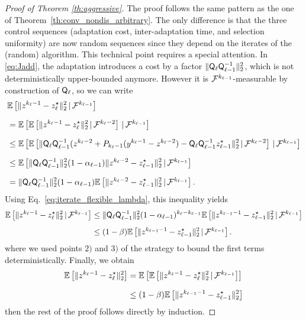 {\begin{proof}[Proof of Theorem \ref{th:aggressive}]
The proof follows the same pattern as the one of Theorem~\ref{th:conv_nondis_arbitrary}.
The only difference is that the three control sequences (adaptation cost, inter-adaptation time, and selection uniformity) are now random sequences
since they depend on the iterates of the (random) algorithm. This technical point requires a special attention. 
In \eqref{eq:Jadd}, the adaptation introduces a cost by a factor $\|  {\mathsf{Q}}_\ell   {\mathsf{Q}}_{\ell-1}^{-1} \|_2^2 $, which is not deterministically upper-bounded  anymore. However it is $\mathcal{F}^{k_{\ell-1}}$-measurable by construction of ${\mathsf{Q}}_\ell$, so we can write
\begin{align*}
  \nonumber & \mathbb{E}\left[\|z^{k_\ell-1}-z^{\star}_{\ell}\|_2^2\,|\,\mathcal{F}^{k_{\ell-1}}\right] \\[1.5ex]
  \nonumber & = \mathbb{E}\left[\mathbb{E}\left[\|z^{k_\ell-1}-z^{\star}_{\ell}\|_2^2\,|\,\mathcal{F}^{k_{\ell}-2}\right]\,|\,\mathcal{F}^{k_{\ell-1}}\right]\\[1.5ex]
  &\leq   \mathbb{E}\left[\mathbb{E}\left[ \|  {\mathsf{Q}}_\ell   {\mathsf{Q}}_{\ell-1}^{-1}(z^{k_{\ell}-2} + P_{k_{\ell}-1}(y^{k_{\ell}-1}-z^{k_{\ell}-2}) - {\mathsf{Q}}_\ell   {\mathsf{Q}}_{\ell-1}^{-1}z^{\star}_{\ell-1}\|_2^2\,|\,\mathcal{F}^{k_{\ell}-2}\right]\,|\,\mathcal{F}^{k_{\ell-1}}\right]\\[1.5ex]
   \nonumber     &\leq \mathbb{E}\left[\|  {\mathsf{Q}}_\ell   {\mathsf{Q}}_{\ell-1}^{-1} \|_2^2  (1-\alpha_{\ell-1}) \|z^{k_\ell-2}-z^{\star}_{\ell-1}\|_2^2\,|\,\mathcal{F}^{k_{\ell-1}}\right]\\[1.5ex]
      \nonumber     &= \| {\mathsf{Q}}_\ell   {\mathsf{Q}}_{\ell-1}^{-1} \|_2^2  (1-\alpha_{\ell-1}) \mathbb{E}\left[ \|z^{k_\ell-2}-z^{\star}_{\ell-1}\|_2^2\,|\,\mathcal{F}^{k_{\ell-1}}\right].
   \end{align*} 
   Using Eq.~\eqref{eq:iterate_flexible_lambda}, this inequality yields  
  \begin{align*}
   \mathbb{E}\left[\|z^{k_\ell-1}-z^{\star}_{\ell}\|_2^2\,|\,\mathcal{F}^{k_{\ell-1}}\right]
   &\leq \|  {\mathsf{Q}}_\ell   {\mathsf{Q}}_{\ell-1}^{-1} \|_2^2  (1-\alpha_{\ell-1})^{k_\ell-k_{\ell-1}}  \mathbb{E}\left[  \|z^{k_{\ell-1}-1}-z^{\star}_{\ell-1}\|_2^2\,|\,\mathcal{F}^{k_{\ell-1}}\right]\\[1ex]
&\leq (1-\beta) \mathbb{E}\left[  \|z^{k_{\ell-1}-1}-z^{\star}_{\ell-1}\|_2^2\,|\,\mathcal{F}^{k_{\ell-1}}\right].
\end{align*}
where we used points $2)$ and $3)$ of the strategy to bound the first terms deterministically. Finally, we obtain
\begin{align*}
\mathbb{E}\left[\|z^{k_\ell-1}-z^{\star}_{\ell}\|_2^2\right]
& = \mathbb{E}\left[\mathbb{E}\left[\|z^{k_\ell-1}-z^{\star}_{\ell}\|_2^2\,|\,\mathcal{F}^{k_{\ell-1}}\right]\right]\\[1.5ex]
&\leq (1-\beta) \mathbb{E}\left[\|z^{k_{\ell-1}-1}-z^{\star}_{\ell-1}\|_2^2\right]
\end{align*}
then the rest of the proof follows directly by induction.
\end{proof}
        
}
